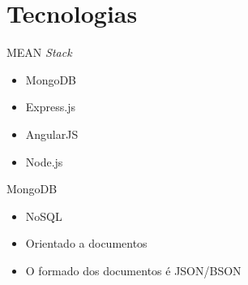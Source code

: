 \documentclass{beamer}
\newlength{\wideitemsep}
\let\olditem\item
\renewcommand{\item}{\setlength{\itemsep}{\wideitemsep}\olditem}
\begin{document}
\section{Tecnologias}

\begin{frame}{MEAN \textit{Stack}}
\begin{itemize}
        \item MongoDB
        \item Express.js
        \item AngularJS
        \item Node.js
    \end{itemize}
\end{frame}

\begin{frame}{MongoDB}
    \begin{itemize}
        \item NoSQL 
        \item Orientado a documentos
        \item O formado dos documentos é JSON/BSON
     \end{itemize}
\end{frame}

\end{document}
